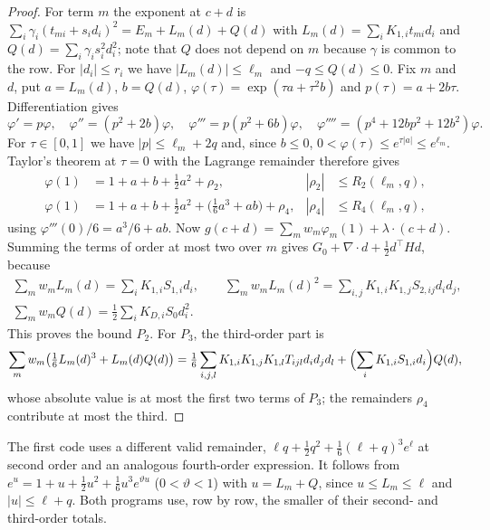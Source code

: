 \begin{proof}
For term $m$ the exponent at $c+d$ is $\sum_i\gamma_i(t_{mi}+s_id_i)^2=E_m+L_m(d)+Q(d)$ with
$L_m(d)=\sum_iK_{1,i}t_{mi}d_i$ and $Q(d)=\sum_i\gamma_is_i^2d_i^2$; note that $Q$ does not depend on $m$ because $\gamma$ is common to the row.
For $|d_i|\le r_i$ we have $|L_m(d)|\le\ell_m$ and $-q\le Q(d)\le0$.
Fix $m$ and $d$, put $a=L_m(d)$, $b=Q(d)$, $\varphi(\tau)=\exp(\tau a+\tau^2b)$ and $p(\tau)=a+2b\tau$.
Differentiation gives
\begin{equation*}
  \varphi'=p\varphi,\quad \varphi''=(p^2+2b)\varphi,\quad \varphi'''=p(p^2+6b)\varphi,\quad \varphi''''=(p^4+12bp^2+12b^2)\varphi .
\end{equation*}
For $\tau\in[0,1]$ we have $|p|\le\ell_m+2q$ and, since $b\le0$, $0<\varphi(\tau)\le e^{\tau|a|}\le e^{\ell_m}$.
Taylor's theorem at $\tau=0$ with the Lagrange remainder therefore gives
\begin{align*}
  \varphi(1)&=1+a+b+\tfrac12a^2+\rho_2, & |\rho_2|&\le R_2(\ell_m,q),\\
  \varphi(1)&=1+a+b+\tfrac12a^2+\bigl(\tfrac16a^3+ab\bigr)+\rho_4, & |\rho_4|&\le R_4(\ell_m,q),
\end{align*}
using $\varphi'''(0)/6=a^3/6+ab$.
Now $g(c+d)=\sum_mw_m\varphi_m(1)+\lambda\cdot(c+d)$.
Summing the terms of order at most two over $m$ gives $G_0+\nabla\cdot d+\frac12d^\top Hd$, because
\begin{gather*}
  \sum_mw_mL_m(d)=\sum_iK_{1,i}S_{1,i}d_i,\qquad
  \sum_mw_mL_m(d)^2=\sum_{i,j}K_{1,i}K_{1,j}S_{2,ij}d_id_j,\\
  \sum_mw_mQ(d)=\tfrac12\sum_iK_{D,i}S_0d_i^2 .
\end{gather*}
This proves the bound $P_2$.
For $P_3$, the third-order part is
\begin{equation*}
  \sum_mw_m\bigl(\tfrac16L_m(d)^3+L_m(d)Q(d)\bigr)=\tfrac16\sum_{i,j,l}K_{1,i}K_{1,j}K_{1,l}T_{ijl}d_id_jd_l+\Bigl(\sum_iK_{1,i}S_{1,i}d_i\Bigr)Q(d),
\end{equation*}
whose absolute value is at most the first two terms of $P_3$; the remainders $\rho_4$ contribute at most the third.
\end{proof}

The first code uses a different valid remainder, $\ell q+\frac12q^2+\frac16(\ell+q)^3e^{\ell}$ at second order and an analogous fourth-order expression.
It follows from $e^u=1+u+\frac12u^2+\frac16u^3e^{\vartheta u}$ ($0<\vartheta<1$) with $u=L_m+Q$, since $u\le L_m\le\ell$ and $|u|\le\ell+q$.
Both programs use, row by row, the smaller of their second- and third-order totals.

